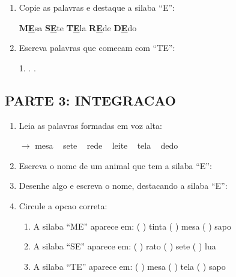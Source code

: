 \begin{exercicio}
\begin{enumerate}[resume]
  \item Copie as palavras e destaque a silaba ``E'':
  \begin{center}
  \textbf{M}\underline{\textbf{E}}sa \quad \textbf{S}\underline{\textbf{E}}te \quad \textbf{T}\underline{\textbf{E}}la \quad \textbf{R}\underline{\textbf{E}}de \quad \textbf{D}\underline{\textbf{E}}do
  \end{center}

  \item Escreva palavras que comecam com ``TE'':
  \begin{center}
  1. \underline{\hspace{3cm}} . \underline{\hspace{3cm}} . \underline{\hspace{3cm}}
  \end{center}
\end{enumerate}

\subsection*{PARTE 3: INTEGRACAO}

\begin{enumerate}[resume]
  \item Leia as palavras formadas em voz alta:
  \begin{center}
  $\rightarrow$ mesa  ~  sete  ~  rede  ~  leite  ~  tela  ~  dedo
  \end{center}

  \item Escreva o nome de um animal que tem a silaba ``E'':
  \begin{center}
  \underline{\hspace{6cm}}
  \end{center}

  \item Desenhe algo e escreva o nome, destacando a silaba ``E'':
  \begin{center}
  \end{center}

  \item Circule a opcao correta:
  \begin{enumerate}[label=(\alph*)]
    \item A silaba ``ME'' aparece em: ( ) tinta ( ) mesa ( ) sapo
    \item A silaba ``SE'' aparece em: ( ) rato ( ) sete ( ) lua
    \item A silaba ``TE'' aparece em: ( ) mesa ( ) tela ( ) sapo
  \end{enumerate}


\end{enumerate}
\end{exercicio}
